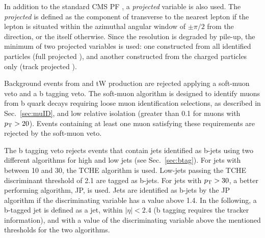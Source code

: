 In addition to the standard CMS PF \MET, a \textit{projected} \MET variable is also used. The \textit{projected} \MET is defined as the component of \ptmiss transverse to the nearest lepton if the lepton is situated within the azimuthal angular window of $\pm \pi/2$ from the \ptmiss direction, or the \MET itself otherwise.
Since the \MET resolution is degraded by pile-up, the minimum of two projected \MET variables is used: one constructed from all identified particles (full projected \MET), and another constructed from the charged particles only (track projected \MET).

Background events from \ttbar and tW production are rejected applying a soft-muon veto and a b tagging veto. The soft-muon algorithm is designed to identify muons from b quark decays requiring loose muon identification selections, as described in Sec.~\ref{sec:muID}, and low relative isolation (greater than 0.1 for muons with $p_\mathrm{T}>20$\GeV). Events containing at least one muon satisfying these requirements are rejected by the soft-muon veto.

The b tagging veto rejects events that contain jets identified as b-jets using two different algorithms for high and low \pt jets (see Sec.~\ref{sec:btag}). For jets with \pt between 10 and 30\GeV, the TCHE algorithm is used. Low-\pt jets passing the TCHE discriminant threshold of 2.1 are tagged as b-jets.
For jets with $p_\mathrm{T}>30$\GeV, a better performing algorithm, JP, is used. Jets are identified as b-jets by the JP algorithm if the discriminating variable has a value above 1.4.
In the following, a b-tagged jet is defined as a jet, within $|\eta|<2.4$ (b tagging requires the tracker information), and with a value of the discriminating variable above the mentioned thresholds for the two algorithms.

